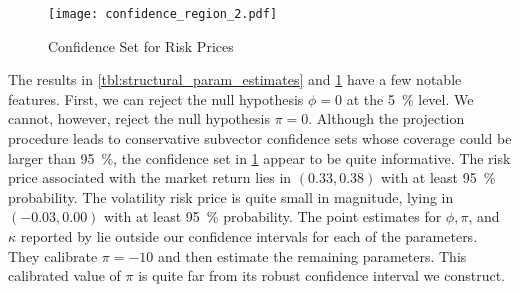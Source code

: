 \documentclass[11pt, letterpaper, twoside]{article}
\begin{document}
\begin{figure}[htb]
	
	\centering
	\caption{Confidence Set for Risk Prices}
	\label{fig:confidence_region}
	
	\texttt{[image: confidence\_region\_2.pdf]}
\end{figure}


The results in \cref{tbl:structural_param_estimates} and \cref{fig:confidence_region} have a few notable features. First, we can reject the null hypothesis $\phi = 0$ at the \SI{5}{\percent} level. We cannot, however, reject the null hypothesis $\pi = 0$. Although the projection procedure leads to conservative subvector confidence sets whose coverage could be larger than \SI{95}{\percent}, the confidence set in \cref{fig:confidence_region} appear to be quite informative. The risk price associated with the market return lies in $(0.33, 0.38)$ with at least \SI{95}{\percent} probability. The volatility risk price is quite small in magnitude, lying in $(-0.03, 0.00)$ with at least \SI{95}{\percent} probability. The point estimates for $\phi, \pi$, and $\kappa$ reported by \textcite{han2018leverage} lie outside our confidence intervals for each of the parameters. They calibrate $\pi = -10$ and then estimate the remaining parameters. This calibrated value of $\pi$ is quite far from its robust confidence interval we construct.



\end{document}
